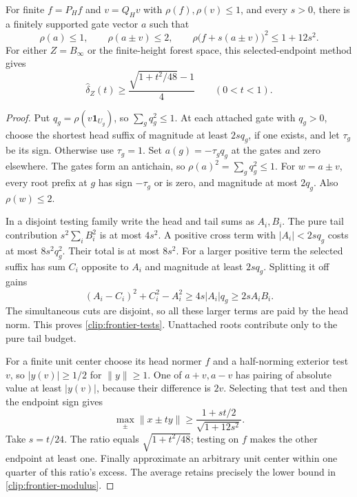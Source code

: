\begin{proposition}
\label{clip:frontier-prop}
For finite $f=P_Hf$ and $v=Q_Hv$ with $\rho(f),\rho(v)\le1$,
and every $s>0$, there is a finitely supported gate vector $a$ such that
\begin{equation}\label{clip:frontier-tests}
 \rho(a)\le1,\qquad \rho(a\pm v)\le2,\qquad
 \rho\bigl(f+s(a\pm v)\bigr)^2\le1+12s^2.
\end{equation}
For either $Z=B_\infty$ or the finite-height forest space, this
selected-endpoint method gives
\begin{equation}\label{clip:frontier-modulus}
 \widehat\delta_Z(t)\ge
 \frac{\sqrt{1+t^2/48}-1}{4}\qquad(0<t<1).
\end{equation}
\end{proposition}
\begin{proof}
Put $q_g=\rho(v\mathbf1_{U_g})$, so $\sum_gq_g^2\le1$.
At each attached gate with $q_g>0$, choose the shortest head suffix
of magnitude at least $2sq_g$, if one exists, and let $\tau_g$
be its sign. Otherwise use $\tau_g=1$. Set
$a(g)=-\tau_gq_g$ at the gates and zero elsewhere.
The gates form an antichain, so $\rho(a)^2=\sum_gq_g^2\le1$.
For $w=a\pm v$, every root prefix at $g$ has sign
$-\tau_g$ or is zero, and magnitude at most $2q_g$.
Also $\rho(w)\le2$.

In a disjoint testing family write the head and tail sums as $A_i,B_i$.
The pure tail contribution $s^2\sum_iB_i^2$ is at most $4s^2$.
A positive cross term with $|A_i|<2sq_g$ costs at most
$8s^2q_g^2$. Their total is at most $8s^2$.
For a larger positive term the selected suffix has sum $C_i$
opposite to $A_i$ and magnitude at least $2sq_g$.
Splitting it off gains
\[
 (A_i-C_i)^2+C_i^2-A_i^2
 \ge4s|A_i|q_g\ge2sA_iB_i.
\]
The simultaneous cuts are disjoint, so all these larger terms are
paid by the head norm. This proves \eqref{clip:frontier-tests}.
Unattached roots contribute only to the pure tail budget.

For a finite unit center choose its head normer $f$ and a half-norming
exterior test $v$, so $|y(v)|\ge1/2$ for $\|y\|\ge1$.
One of $a+v,a-v$ has pairing of absolute value at least $|y(v)|$,
because their difference is $2v$. Selecting that test and then the
endpoint sign gives
\[
 \max_\pm\|x\pm ty\|\ge
 \frac{1+st/2}{\sqrt{1+12s^2}}.
\]
Take $s=t/24$. The ratio equals $\sqrt{1+t^2/48}$; testing on
$f$ makes the other endpoint at least one. Finally approximate an
arbitrary unit center within one quarter of this ratio's excess.
The average retains precisely the lower bound in
\eqref{clip:frontier-modulus}.
\end{proof}

